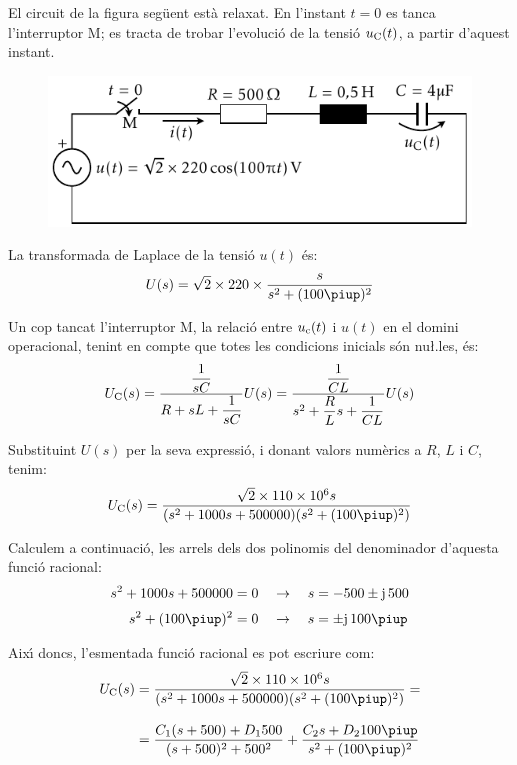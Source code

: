\begin{exemple}
El circuit de la figura seg\"{u}ent est\`{a} relaxat. En l'instant $t=0$ es
tanca l'interruptor M; es tracta de trobar l'evoluci\'{o} de la tensi\'{o}
$u_\mathrm{C}(t)$, a partir d'aquest instant.
\begin{figure}[h]
\centering
    \includegraphics{Imatges/Cap-Laplace-Exemple4-Circuit.pdf}
\end{figure}


La transformada de Laplace de la tensi\'{o} $u(t)$ \'{e}s:
\[
    U(s) = \sqrt{2}\times 220\times \frac{s}{s^2 + (100\piup)^2}
\]

\break
Un cop tancat l'interruptor M, la relaci\'{o} entre $u_\mathrm{c}(t)$ i
$u(t)$ en el domini operacional, tenint en compte que totes les
condicions inicials s\'{o}n nu{\l.l}es, \'{e}s:
\[
    U_\mathrm{C}(s) = \frac{\dfrac{1}{sC}}{R+ sL +\dfrac{1}{sC}} U(s)=
    \frac{\dfrac{1}{CL}}{s^2 + \dfrac{R}{L}s +\dfrac{1}{CL}} U(s)
\]

Substituint $U(s)$ per la seva expressi\'{o}, i donant valors num\`{e}rics a
$R$, $L$ i $C$, tenim:
\[
    U\ped{C}(s) = \frac{\sqrt{2}\times 110\times 10^6 s}{(s^2 + 1000 s + 500000)(s^2 + (100\piup)^2)}
\]

Calculem a continuaci\'{o}, les arrels dels dos polinomis  del
denominador d'aquesta funci\'{o} racional:
\begin{align*}
    s^2 + 1000 s + 500000 &= 0 \quad\rightarrow\quad s = -500
    \pm\ju\,500 \\[0.5ex]
    s^2 + (100\piup)^2 &= 0 \quad\rightarrow\quad s = \pm\ju\,100\piup
\end{align*}

Aix\'{\i} doncs, l'esmentada funci\'{o} racional es pot escriure com:
\[\begin{split}
U\ped{C}(s) &= \frac{\sqrt{2}\times 110\times 10^6 s}{(s^2 + 1000 s +
500000)(s^2 + (100\piup)^2)}  = \\[2ex] &= \frac{C_1 (s+500) + D_1
500}{(s+500)^2+500^2} + \frac{C_2 s + D_2 100 \piup}{s^2 +(100\piup)^2}
\end{split}\]



\end{exemple}
